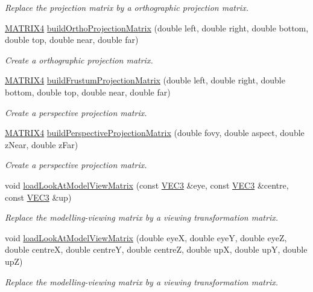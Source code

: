 \begin{DoxyCompactItemize}
\begin{DoxyCompactList}\small\item\em Replace the projection matrix by a orthographic projection matrix. \end{DoxyCompactList}\item 
\hyperlink{class_math_1_1_matrix4x4}{MATRIX4} \hyperlink{namespace_utilities_a7ffbee866eb154b2a032141c04d43021}{buildOrthoProjectionMatrix} (double left, double right, double bottom, double top, double near, double far)
\begin{DoxyCompactList}\small\item\em Create a orthographic projection matrix. \end{DoxyCompactList}\item 
\hyperlink{class_math_1_1_matrix4x4}{MATRIX4} \hyperlink{namespace_utilities_aaa85ac0797b49093c4344ce75c4a3265}{buildFrustumProjectionMatrix} (double left, double right, double bottom, double top, double near, double far)
\begin{DoxyCompactList}\small\item\em Create a perspective projection matrix. \end{DoxyCompactList}\item 
\hyperlink{class_math_1_1_matrix4x4}{MATRIX4} \hyperlink{namespace_utilities_ae473d6bd8d417fc07465944092a92938}{buildPerspectiveProjectionMatrix} (double fovy, double aspect, double zNear, double zFar)
\begin{DoxyCompactList}\small\item\em Create a perspective projection matrix. \end{DoxyCompactList}\item 
void \hyperlink{namespace_utilities_adcb191e43b838d267bd659167503a528}{loadLookAtModelViewMatrix} (const \hyperlink{class_math_1_1_vec3}{VEC3} \&eye, const \hyperlink{class_math_1_1_vec3}{VEC3} \&centre, const \hyperlink{class_math_1_1_vec3}{VEC3} \&up)
\begin{DoxyCompactList}\small\item\em Replace the modelling-\/viewing matrix by a viewing transformation matrix. \end{DoxyCompactList}\item 
void \hyperlink{namespace_utilities_a8dfe8f9df9a5280d2b19e278b6c455eb}{loadLookAtModelViewMatrix} (double eyeX, double eyeY, double eyeZ, double centreX, double centreY, double centreZ, double upX, double upY, double upZ)
\begin{DoxyCompactList}\small\item\em Replace the modelling-\/viewing matrix by a viewing transformation matrix. \end{DoxyCompactList}\item 

\end{DoxyCompactItemize}
